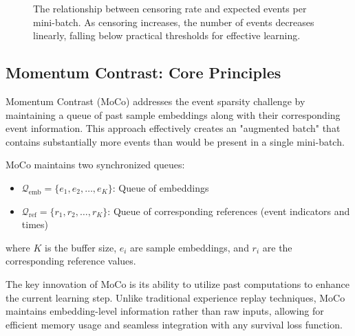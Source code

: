 \begin{figure}[ht]
  \caption{The relationship between censoring rate and expected events per mini-batch. As censoring increases, the number of events decreases linearly, falling below practical thresholds for effective learning.}
  \label{fig:event-sparsity}
\end{figure}

\subsection{Momentum Contrast: Core Principles}

Momentum Contrast (MoCo) addresses the event sparsity challenge by maintaining a queue of past sample embeddings along with their corresponding event information. This approach effectively creates an "augmented batch" that contains substantially more events than would be present in a single mini-batch.

\begin{definitionbox}[title=Momentum Contrast Buffer]
  MoCo maintains two synchronized queues:
  \begin{itemize}
  \item $\mathcal{Q}_{\text{emb}} = \{e_1, e_2, \ldots, e_K\}$: Queue of embeddings
  \item $\mathcal{Q}_{\text{ref}} = \{r_1, r_2, \ldots, r_K\}$: Queue of corresponding references (event indicators and times)
  \end{itemize}
  
  where $K$ is the buffer size, $e_i$ are sample embeddings, and $r_i$ are the corresponding reference values.
\end{definitionbox}

The key innovation of MoCo is its ability to utilize past computations to enhance the current learning step. Unlike traditional experience replay techniques, MoCo maintains embedding-level information rather than raw inputs, allowing for efficient memory usage and seamless integration with any survival loss function.

